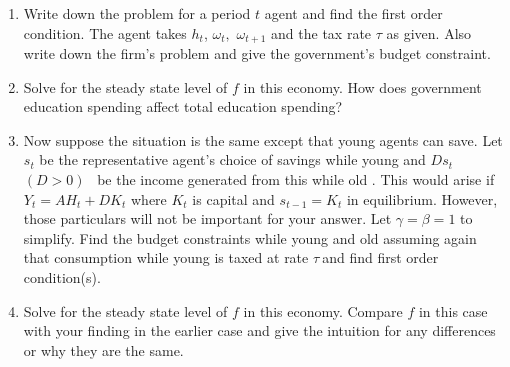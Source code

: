 \documentclass[12pt]{article}
\begin{document}
\begin{enumerate}
\begin{enumerate}
\item Write down the problem for a period $t$ agent and find the first order
condition. The agent takes $h_{t}$, $\omega _{t},$ $\omega _{t+1}$ and the
tax rate $\tau $ as given. Also write down the firm's problem and give the
government's budget constraint.

\item Solve for the steady state level of $f$ in this economy. How does
government education spending affect total education spending?

\item Now suppose the situation is the same except that young agents can
save. Let $s_{t}$ be the representative agent's choice of savings while
young and $Ds_{t}$ $(D>0)$ \ be the income generated from this while old .
This would arise if $Y_{t}=AH_{t}+DK_{t}$ where $K_{t}$ is capital and $%
s_{t-1}=K_{t}$ in equilibrium. However, those particulars will not be
important for your answer. Let $\gamma =\beta =1$ to simplify. Find the
budget constraints while young and old assuming again that consumption while
young is taxed at rate $\tau \ $and find first order condition(s).

\item Solve for the steady state level of $f$ in this economy. Compare $f$
in this case with your finding in the earlier case and give the intuition
for any differences or why they are the same.
\end{enumerate}
\end{enumerate}

\pagebreak
\end{document}
